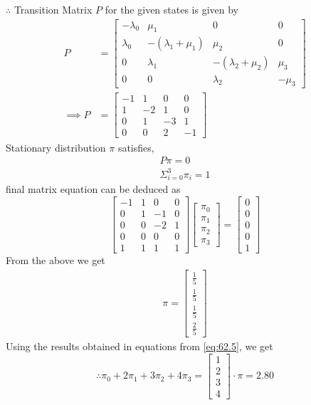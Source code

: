 \documentclass[journal,12pt,twocolumn]{IEEEtran}
\theoremstyle{remark}
\begin{document}
$\therefore$ Transition Matrix $P$ for the given states is given by 
\begin{equation}
\label{eq:62.3}
\begin{split}
P &= \begin{bmatrix}
-\lambda_0 & \mu_1 & 0 & 0 \\
\lambda_0 & -(\lambda_1 + \mu_1) & \mu_2 & 0 \\
0 & \lambda_1 & -(\lambda_2 + \mu_2) & \mu_3\\
0 & 0 & \lambda_2 & -\mu_3
\end{bmatrix}\\
\implies 
P &= \begin{bmatrix}
-1 & 1 & 0 & 0 \\
1 & -2 & 1 & 0 \\
0 & 1 & -3 & 1\\
0 & 0 & 2 & -1
\end{bmatrix}
\end{split}
\end{equation}
Stationary distribution $\pi$ satisfies,
\begin{equation}
\begin{split}
\label{eq:62.4}
P\pi = 0\\
\Sigma_{i=0}^{3}\pi_i = 1
\end{split}
\end{equation}
final matrix equation can be deduced as
\begin{equation}
\label{eq:62.5}
\begin{bmatrix}
-1 & 1 & 0 & 0 \\
0 & 1 & -1 & 0 \\
0 & 0 & -2 & 1\\
0 & 0 & 0 & 0\\
1 & 1 & 1 & 1 
\end{bmatrix}
\begin{bmatrix}
\pi_0\\
\pi_1\\
\pi_2\\
\pi_3
\end{bmatrix} =
\begin{bmatrix}
0\\
0\\
0\\
0\\
1
\end{bmatrix}
\end{equation}
From the above we get
\begin{equation}
\label{eq:62.6}
\begin{split}
\pi = \begin{bmatrix}
\frac{1}{5}\\
\frac{1}{5}\\
\frac{1}{5}\\
\frac{2}{5}
\end{bmatrix}
\end{split}
\end{equation}
Using the results obtained in equations from \eqref{eq:62.5}, we get 
\begin{equation}
\therefore \pi_0 + 2\pi_1 + 3\pi_2 + 4\pi_3 = \begin{bmatrix}1\\
2\\
3\\
4
\end{bmatrix}
\cdot \pi = 2.80
\end{equation}
\end{document}
